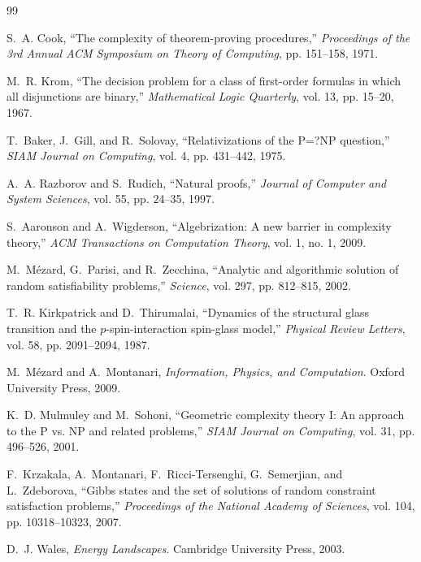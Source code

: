 \documentclass[11pt,a4paper]{article}
\theoremstyle{plain}
\theoremstyle{definition}
\theoremstyle{remark}
\begin{document}
\begin{thebibliography}{99}

S.~A. Cook, ``The complexity of theorem-proving procedures,'' \emph{Proceedings of the 3rd Annual ACM Symposium on Theory of Computing}, pp. 151--158, 1971.

M.~R. Krom, ``The decision problem for a class of first-order formulas in which all disjunctions are binary,'' \emph{Mathematical Logic Quarterly}, vol. 13, pp. 15--20, 1967.

T.~Baker, J.~Gill, and R.~Solovay, ``Relativizations of the P=?NP question,'' \emph{SIAM Journal on Computing}, vol. 4, pp. 431--442, 1975.

A.~A. Razborov and S.~Rudich, ``Natural proofs,'' \emph{Journal of Computer and System Sciences}, vol. 55, pp. 24--35, 1997.

S.~Aaronson and A.~Wigderson, ``Algebrization: A new barrier in complexity theory,'' \emph{ACM Transactions on Computation Theory}, vol. 1, no. 1, 2009.

M.~M{\'e}zard, G.~Parisi, and R.~Zecchina, ``Analytic and algorithmic solution of random satisfiability problems,'' \emph{Science}, vol. 297, pp. 812--815, 2002.

T.~R. Kirkpatrick and D.~Thirumalai, ``Dynamics of the structural glass transition and the $p$-spin-interaction spin-glass model,'' \emph{Physical Review Letters}, vol. 58, pp. 2091--2094, 1987.

M.~M{\'e}zard and A.~Montanari, \emph{Information, Physics, and Computation}. Oxford University Press, 2009.

K.~D. Mulmuley and M.~Sohoni, ``Geometric complexity theory I: An approach to the P vs. NP and related problems,'' \emph{SIAM Journal on Computing}, vol. 31, pp. 496--526, 2001.

F.~Krzakala, A.~Montanari, F.~Ricci-Tersenghi, G.~Semerjian, and L.~Zdeborova, ``Gibbs states and the set of solutions of random constraint satisfaction problems,'' \emph{Proceedings of the National Academy of Sciences}, vol. 104, pp. 10318--10323, 2007.

D.~J. Wales, \emph{Energy Landscapes}. Cambridge University Press, 2003.


\end{thebibliography}
\end{document}
